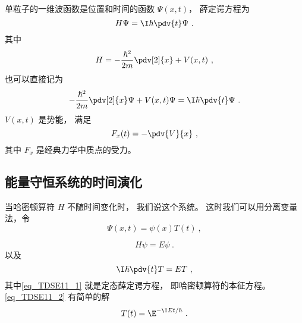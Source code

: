 
\begin{issues}
\issueDraft
\end{issues}


单粒子的一维波函数是位置和时间的函数 $\Psi(x, t)$， 薛定谔方程为
\begin{equation}\label{eq_TDSE11_6}
H\Psi = \I\hbar \pdv{t}\Psi~.
\end{equation}
其中
\begin{equation}
H = -\frac{\hbar^2}{2m}\pdv[2]{x} + V(x, t)~,
\end{equation}
也可以直接记为
\begin{equation}\label{eq_TDSE11_3}
-\frac{\hbar^2}{2m}\pdv[2]{x}\Psi + V(x, t)\Psi = \I\hbar \pdv{t}\Psi~.
\end{equation}
$V(x,t)$ 是势能， 满足
\begin{equation}
F_x(t) = -\pdv{V}{x}~,
\end{equation}
其中 $F_x$ 是经典力学中质点的受力。

\subsection{能量守恒系统的时间演化}
当哈密顿算符 $H$ 不随时间变化时， 我们说这个系统。 这时我们可以用分离变量法，令
\begin{equation}
\Psi(x, t) = \psi(x) T(t)~,
\end{equation}
 
\begin{equation}\label{eq_TDSE11_1}
H\psi = E\psi~.
\end{equation}
以及
\begin{equation}\label{eq_TDSE11_2}
\I \hbar\pdv{t}T = ET~,
\end{equation}
其中\autoref{eq_TDSE11_1} 就是定态薛定谔方程， 即哈密顿算符的本征方程。 \autoref{eq_TDSE11_2} 有简单的解
\begin{equation}
T(t) = \E^{-\I E t/\hbar}~.
\end{equation}

